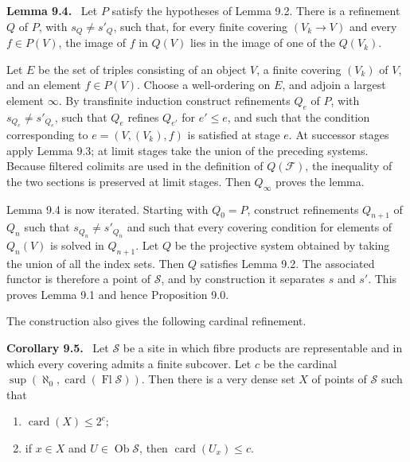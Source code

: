 \documentclass[11pt]{article}
\newcommand{\Ob}{\operatorname{Ob}}
\newenvironment{statement}[1]{\par\medskip\noindent\textbf{#1.}\ }{\par\medskip}
\begin{document}
\begin{statement}{Lemma 9.4}
Let \(P\) satisfy the hypotheses of Lemma 9.2. There is a refinement \(Q\) of \(P\), with \(s_Q\ne s'_Q\), such that, for every finite covering \((V_k\to V)\) and every \(f\in P(V)\), the image of \(f\) in \(Q(V)\) lies in the image of one of the \(Q(V_k)\).
\end{statement}
Let \(E\) be the set of triples consisting of an object \(V\), a finite covering \((V_k)\) of \(V\), and an element \(f\in P(V)\). Choose a well-ordering on \(E\), and adjoin a largest element \(\infty\). By transfinite induction construct refinements \(Q_e\) of \(P\), with \(s_{Q_e}\ne s'_{Q_e}\), such that \(Q_e\) refines \(Q_{e'}\) for \(e'\le e\), and such that the condition corresponding to \(e=(V,(V_k),f)\) is satisfied at stage \(e\). At successor stages apply Lemma 9.3; at limit stages take the union of the preceding systems. Because filtered colimits are used in the definition of \(Q(\mathcal F)\), the inequality of the two sections is preserved at limit stages. Then \(Q_\infty\) proves the lemma.

Lemma 9.4 is now iterated. Starting with \(Q_0=P\), construct refinements \(Q_{n+1}\) of \(Q_n\) such that \(s_{Q_n}\ne s'_{Q_n}\) and such that every covering condition for elements of \(Q_n(V)\) is solved in \(Q_{n+1}\). Let \(Q\) be the projective system obtained by taking the union of all the index sets. Then \(Q\) satisfies Lemma 9.2. The associated functor is therefore a point of \(\mathscr S\), and by construction it separates \(s\) and \(s'\). This proves Lemma 9.1 and hence Proposition 9.0.

The construction also gives the following cardinal refinement.

\begin{statement}{Corollary 9.5}
Let \(\mathscr S\) be a site in which fibre products are representable and in which every covering admits a finite subcover. Let \(c\) be the cardinal \(\sup(\aleph_0,\operatorname{card}(\operatorname{Fl}\mathscr S))\). Then there is a very dense set \(X\) of points of \(\mathscr S\) such that
\begin{enumerate}[label=\roman*)]
\item \(\operatorname{card}(X)\le 2^c\);
\item if \(x\in X\) and \(U\in\Ob\mathscr S\), then \(\operatorname{card}(U_x)\le c\).
\end{enumerate}
\end{statement}
\end{document}
